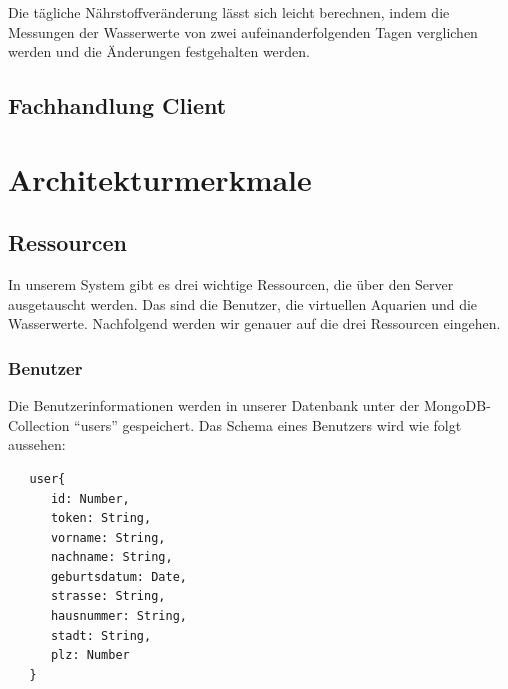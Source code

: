 Die tägliche Nährstoffveränderung lässt sich leicht berechnen, indem die Messungen der Wasserwerte von zwei aufeinanderfolgenden Tagen verglichen werden und die Änderungen festgehalten werden.

\subsection{Fachhandlung Client}



\section{Architekturmerkmale}

\subsection{Ressourcen}

In unserem System gibt es drei wichtige Ressourcen, die über den Server ausgetauscht werden. Das sind die Benutzer, die virtuellen Aquarien und die Wasserwerte. Nachfolgend werden wir genauer auf die drei Ressourcen eingehen.

\subsubsection{Benutzer}

Die Benutzerinformationen werden in unserer Datenbank unter der MongoDB-Collection ``users'' gespeichert. Das Schema eines Benutzers wird wie folgt aussehen:

\begin{lstlisting}
   user{
      id: Number,
      token: String,
      vorname: String,
      nachname: String,
      geburtsdatum: Date,
      strasse: String,
      hausnummer: String,
      stadt: String,
      plz: Number
   }
\end{lstlisting}
 

